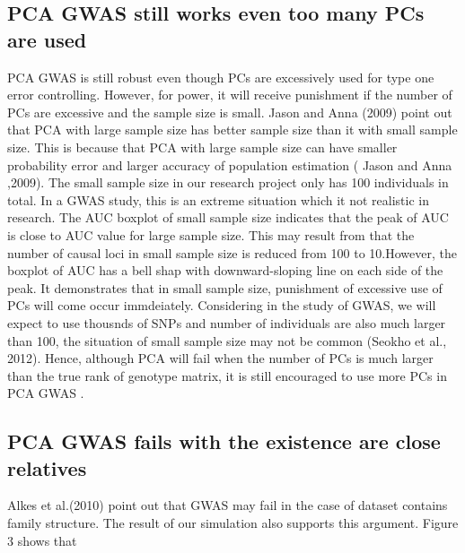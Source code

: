 \documentclass[12pt]{article}
\begin{document}
\subsection{PCA GWAS still works even too many PCs are used}
PCA GWAS is still robust even though PCs are excessively used for type one error controlling. However, for power, it will receive punishment if the number of PCs are excessive and the sample size is small. Jason and Anna (2009) point out that PCA with large sample size has better sample size than it with small sample size. This is because that PCA with large sample size can have smaller probability error and larger accuracy of population estimation ( Jason and Anna ,2009). The small sample size in our research project only has 100 individuals in total. In a GWAS study, this is an extreme situation which it not realistic in research. The AUC boxplot of small sample size indicates that the peak of AUC is close to AUC value for large sample size. This may result from that the number of causal loci in small sample size is reduced from 100 to 10.However, the boxplot of AUC has a bell shap with downward-sloping line on each side of the peak. It demonstrates that in small sample size, punishment of excessive use of PCs will come occur immdeiately. Considering in the study of GWAS, we will expect to use thousnds of SNPs and number of individuals are also much larger than 100, the situation of small sample size may not be common (Seokho et al., 2012). Hence, although PCA will fail when the number of PCs is much larger than the true rank of genotype matrix, it is still encouraged to use more PCs in PCA GWAS .

\subsection{PCA GWAS fails with the existence are close relatives }
Alkes et al.(2010) point out that GWAS may fail in the case of dataset contains  family structure. The result of our simulation also supports this argument. Figure 3 shows that 
\end{document}
